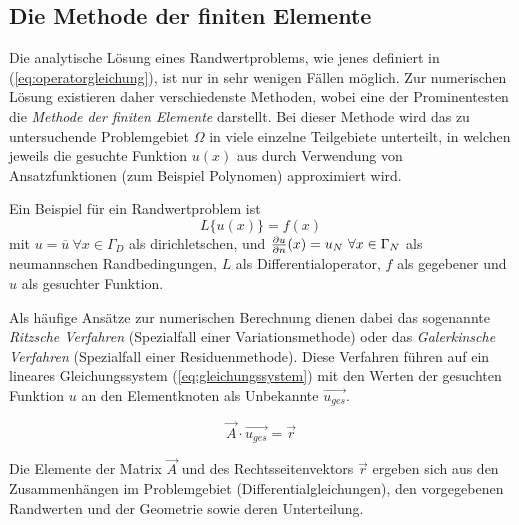 \subsection{Die Methode der finiten Elemente}
\label{sec:fem_theory}
Die analytische Lösung eines Randwertproblems, wie jenes definiert in (\ref{eq:operatorgleichung}), ist nur in sehr wenigen Fällen möglich. Zur numerischen Lösung existieren daher verschiedenste Methoden, wobei eine der Prominentesten die \textit{Methode der finiten Elemente} darstellt. Bei dieser Methode wird das zu untersuchende Problemgebiet $\Omega$ in viele einzelne Teilgebiete unterteilt, in welchen jeweils die gesuchte Funktion $u(x)$ aus durch Verwendung von Ansatzfunktionen (zum Beispiel Polynomen) approximiert wird. \newline

Ein Beispiel für ein Randwertproblem ist
\begin{equation}
L\{u(x)\} = f(x)
\label{eq:operatorgleichung}
\end{equation}
mit $u = \overline{u} \ \forall x\in \Gamma_D$ als dirichletschen, und $\frac{\partial u}{\partial n}(x) = u_N \ \forall x \in \Gamma_N $ als neumannschen Randbedingungen, $L$ als Differentialoperator, $f$ als gegebener und $u$ als gesuchter Funktion.\newline

Als häufige Ansätze zur numerischen Berechnung dienen dabei das sogenannte \textit{Ritzsche Verfahren} (Spezialfall einer Variationsmethode) oder das \textit{Galerkinsche Verfahren} (Spezialfall einer Residuenmethode). Diese Verfahren führen auf ein lineares Gleichungssystem (\ref{eq:gleichungssystem}) mit den Werten der gesuchten Funktion $u$ an den Elementknoten als Unbekannte $\vec{u_{ges}}$.

\begin{equation}
\vec{A} \cdot \vec{u_{ges}} = \vec{r}
\label{eq:gleichungssystem}
\end{equation}

Die Elemente der Matrix $\vec{A}$ und des Rechtsseitenvektors $\vec{r}$ ergeben sich aus den Zusammenhängen im Problemgebiet (Differentialgleichungen), den vorgegebenen Randwerten und der Geometrie sowie deren Unterteilung.\newline
